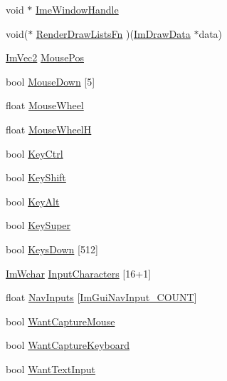 \begin{DoxyCompactItemize}
void $\ast$ \mbox{\hyperlink{struct_im_gui_i_o_a8baa252c4f76764eb866b920f227cfa2}{Ime\+Window\+Handle}}
\item 
void($\ast$ \mbox{\hyperlink{struct_im_gui_i_o_ae16a9f25f36fe9706d8a33fb128e538a}{Render\+Draw\+Lists\+Fn}} )(\mbox{\hyperlink{struct_im_draw_data}{Im\+Draw\+Data}} $\ast$data)
\item 
\mbox{\hyperlink{struct_im_vec2}{Im\+Vec2}} \mbox{\hyperlink{struct_im_gui_i_o_ad2e9e547cb4d2abe8e7d27407efffeb8}{Mouse\+Pos}}
\item 
bool \mbox{\hyperlink{struct_im_gui_i_o_a8f4613baafc93026175d9cdaf4e82d21}{Mouse\+Down}} \mbox{[}5\mbox{]}
\item 
float \mbox{\hyperlink{struct_im_gui_i_o_a21d3ca4928989a2c838b7b4ea95e5824}{Mouse\+Wheel}}
\item 
float \mbox{\hyperlink{struct_im_gui_i_o_a25bed9de908b086e583854438ca7927d}{Mouse\+WheelH}}
\item 
bool \mbox{\hyperlink{struct_im_gui_i_o_a51de8f65dcabb80ef4e0d3c759ffcd7f}{Key\+Ctrl}}
\item 
bool \mbox{\hyperlink{struct_im_gui_i_o_a3c7642214f88862af5b8467f98ac35c9}{Key\+Shift}}
\item 
bool \mbox{\hyperlink{struct_im_gui_i_o_a1e64ef08a4448a2cac874496130992cb}{Key\+Alt}}
\item 
bool \mbox{\hyperlink{struct_im_gui_i_o_afda9e11e21b7ba21573671c38d9f4a81}{Key\+Super}}
\item 
bool \mbox{\hyperlink{struct_im_gui_i_o_a182f42d74cb25a4cf611cc0f776b3848}{Keys\+Down}} \mbox{[}512\mbox{]}
\item 
\mbox{\hyperlink{imgui_8h_af2c7badaf05a0008e15ef76d40875e97}{Im\+Wchar}} \mbox{\hyperlink{struct_im_gui_i_o_af6283418a2bff9db1522a6245476c7ed}{Input\+Characters}} \mbox{[}16+1\mbox{]}
\item 
float \mbox{\hyperlink{struct_im_gui_i_o_a1e6e8142c2c2e09a715fa5efaa0db9fa}{Nav\+Inputs}} \mbox{[}\mbox{\hyperlink{imgui_8h_a1b685ae2d3bd43e9665e1b3e0f578117a649aced582f4c80f70b83814051ffcb3}{Im\+Gui\+Nav\+Input\+\_\+\+C\+O\+U\+NT}}\mbox{]}
\item 
bool \mbox{\hyperlink{struct_im_gui_i_o_af5b8add76c5d833a65df19b5456acd7e}{Want\+Capture\+Mouse}}
\item 
bool \mbox{\hyperlink{struct_im_gui_i_o_a458e4ca98d896adb16e3a41ec6d2b811}{Want\+Capture\+Keyboard}}
\item 
bool \mbox{\hyperlink{struct_im_gui_i_o_a0e53197e96187a57b2d86720bf163f4d}{Want\+Text\+Input}}
\item 

\end{DoxyCompactItemize}
